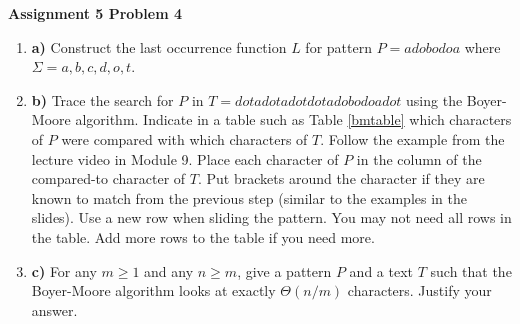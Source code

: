 \documentclass[12pt]{article}
\begin{document}
	
	\begin{center}
		{\Large\bf Assignment 5 Problem 4}\\
		\vspace{3mm}
	\end{center}
	
	\def\question#1{\item[\bf #1.]}
	\def\part#1{\item[\bf #1)]}
	\newcommand{\pc}[1]{\mbox{\textbf{#1}}} %
	
	\begin{enumerate}
		\part{a} Construct the last occurrence function $L$ for pattern $P=adobodoa$  where $\Sigma = {a,b,c,d,o,t}$.
		
		\part{b} Trace the search for $P$ in $T=dotadotadotdotadobodoadot$ using the Boyer-Moore algorithm.
		Indicate in a table such as Table \ref{bmtable} which characters of $P$ were compared with which characters of $T$.
		Follow the example from the lecture video in Module 9.
		Place each character of $P$ in the column of the compared-to character of $T$. 
		Put brackets around the character if they are known to match from the previous step (similar to the examples in the slides). 
		Use a new row when sliding the pattern. You may not need all rows in the table.  Add more rows to the table if you need more.
		
		
		\part{c} For any $m\geq 1$ and any $n\geq m$, give a pattern $P$ and a text $T$ such that the Boyer-Moore algorithm looks at exactly $\Theta(n/m)$ characters.  
		Justify your answer.
		
	\end{enumerate}
	
	
\end{document}
